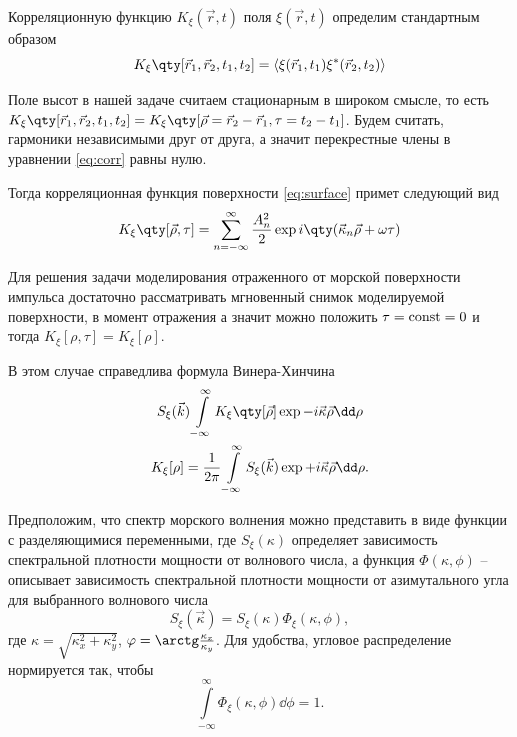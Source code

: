 Корреляционную функцию $K_{\xi}(\vec r,t)$ поля  $\xi(\vec r, t) $ определим
стандартным образом \cite{tihonov}
 \begin{equation}
    \label{eq:corr}
    K_{\xi}\qty[\vec r_1, \vec r_2, t_1,t_2] = \mean{\xi(\vec r_1,t_1)\xi^*(\vec r_2,t_2)}
\end{equation}

Поле высот в нашей задаче считаем стационарным в широком смысле, то есть 
$K_{\xi}\qty[\vec r_{1},\vec r_{2},t_{1},t_{2}] = K_{\xi}\qty[\vec \rho = \vec
r_{2} - \vec r_1, \tau=t_{2}-t_{1}]$. Будем считать, гармоники
независимыми друг от друга, а значит перекрестные члены в уравнении
\eqref{eq:corr} равны нулю.

Тогда корреляционная функция поверхности
\eqref{eq:surface} примет следующий вид
\begin{equation}
    \label{eq:surface_corr}
    K_{\xi}\qty[\vec \rho,\tau] = \sum\limits_{n=-\infty}^{\infty} 
    \frac{A_n^2}{2} 
    \exp{i \qty(\vec \kappa_n \vec \rho + \omega \tau)}
\end{equation}

Для решения задачи моделирования отраженного от морской поверхности импульса
достаточно рассматривать мгновенный снимок моделируемой поверхности, в момент
отражения
а значит можно положить $\tau = \text{\rmfamily\upshape const} = 0$  и  тогда $K_\xi[\rho,\tau] = K_\xi [\rho]$.

В этом случае справедлива формула Винера-Хинчина \cite{tihonov}
\begin{equation}
    \begin{gathered}
    \label{eq:Viner-Hinchin}
        S_\xi(\vec k) \int\limits_{-\infty}^{\infty} K_\xi \qty[\vec \rho] \exp{- i
        \vec \kappa \vec \rho} \dd \rho \\
        K_\xi[\rho] = \frac{1}{2 \pi} \int\limits_{-\infty}^{\infty} S_\xi (\vec k) \exp{+ i
        \vec \kappa \vec \rho} \dd \rho. 
    \end{gathered}
\end{equation}


Предположим, что спектр морского волнения можно представить в виде функции с
разделяющимися переменными, где $S_{\xi}(\kappa)$ определяет зависимость
спектральной плотности мощности от волнового числа, а функция $\Phi(\kappa, \phi)$ -- 
описывает зависимость спектральной плотности мощности от азимутального угла для
выбранного волнового числа
\begin{equation}
    S_\xi(\vec \kappa) = S_\xi(\kappa) \Phi_\xi(\kappa, \phi),
\end{equation}
где $\kappa = \sqrt{\kappa_x^2 + \kappa_y^2}$,  $\phi = \arctg
\frac{\kappa_x}{\kappa_y}$. Для
удобства, угловое распределение нормируется так, чтобы
\begin{equation}
\int\limits_{-\infty}^{\infty} \Phi_\xi(\kappa,\phi) \dd \phi = 1.
\end{equation}

